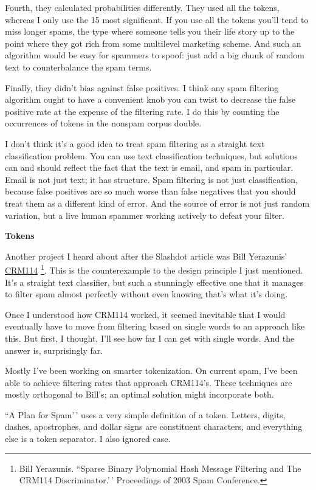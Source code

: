 Fourth, they calculated probabilities differently. They used all the
tokens, whereas I only use the 15 most significant. If you use all the
tokens you'll tend to miss longer spams, the type where someone tells
you their life story up to the point where they got rich from some
multilevel marketing scheme. And such an algorithm would be easy for
spammers to spoof: just add a big chunk of random text to counterbalance
the spam terms.

Finally, they didn't bias against false positives. I think any spam
filtering algorithm ought to have a convenient knob you can twist to
decrease the false positive rate at the expense of the filtering rate. I
do this by counting the occurrences of tokens in the nonspam corpus
double.

I don't think it's a good idea to treat spam filtering as a straight
text classification problem. You can use text classification techniques,
but solutions can and should reflect the fact that the text is email,
and spam in particular. Email is not just text; it has structure. Spam
filtering is not just classification, because false positives are so
much worse than false negatives that you should treat them as a
different kind of error. And the source of error is not just random
variation, but a live human spammer working actively to defeat your
filter.

\textbf{Tokens}

Another project I heard about after the Slashdot article was Bill
Yerazunis' \href{http://crm114.sourceforge.net}{CRM114} \footnote{Bill Yerazunis. ``Sparse Binary Polynomial Hash Message
Filtering and The CRM114 Discriminator.'\,' Proceedings of 2003 Spam
Conference.}. This is
the counterexample to the design principle I just mentioned. It's a
straight text classifier, but such a stunningly effective one that it
manages to filter spam almost perfectly without even knowing that's what
it's doing.

Once I understood how CRM114 worked, it seemed inevitable that I would
eventually have to move from filtering based on single words to an
approach like this. But first, I thought, I'll see how far I can get
with single words. And the answer is, surprisingly far.

Mostly I've been working on smarter tokenization. On current spam, I've
been able to achieve filtering rates that approach CRM114's. These
techniques are mostly orthogonal to Bill's; an optimal solution might
incorporate both.

``A Plan for Spam'\,' uses a very simple definition of a token. Letters,
digits, dashes, apostrophes, and dollar signs are constituent
characters, and everything else is a token separator. I also ignored
case.

